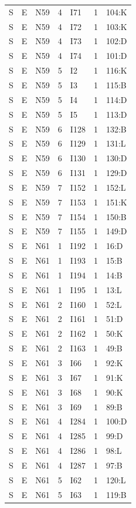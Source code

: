 {\begin{longtable}{lllrlrp{.35\linewidth}}
S & E & N59 & 4 & I71 & 1 & 104:K \\
S & E & N59 & 4 & I72 & 1 & 103:K \\
S & E & N59 & 4 & I73 & 1 & 102:D \\
S & E & N59 & 4 & I74 & 1 & 101:D \\
S & E & N59 & 5 & I2 & 1 & 116:K \\
S & E & N59 & 5 & I3 & 1 & 115:B \\
S & E & N59 & 5 & I4 & 1 & 114:D \\
S & E & N59 & 5 & I5 & 1 & 113:D \\
S & E & N59 & 6 & I128 & 1 & 132:B \\
S & E & N59 & 6 & I129 & 1 & 131:L \\
S & E & N59 & 6 & I130 & 1 & 130:D \\
S & E & N59 & 6 & I131 & 1 & 129:D \\
S & E & N59 & 7 & I152 & 1 & 152:L \\
S & E & N59 & 7 & I153 & 1 & 151:K \\
S & E & N59 & 7 & I154 & 1 & 150:B \\
S & E & N59 & 7 & I155 & 1 & 149:D \\
S & E & N61 & 1 & I192 & 1 & 16:D \\
S & E & N61 & 1 & I193 & 1 & 15:B \\
S & E & N61 & 1 & I194 & 1 & 14:B \\
S & E & N61 & 1 & I195 & 1 & 13:L \\
S & E & N61 & 2 & I160 & 1 & 52:L \\
S & E & N61 & 2 & I161 & 1 & 51:D \\
S & E & N61 & 2 & I162 & 1 & 50:K \\
S & E & N61 & 2 & I163 & 1 & 49:B \\
S & E & N61 & 3 & I66 & 1 & 92:K \\
S & E & N61 & 3 & I67 & 1 & 91:K \\
S & E & N61 & 3 & I68 & 1 & 90:K \\
S & E & N61 & 3 & I69 & 1 & 89:B \\
S & E & N61 & 4 & I284 & 1 & 100:D \\
S & E & N61 & 4 & I285 & 1 & 99:D \\
S & E & N61 & 4 & I286 & 1 & 98:L \\
S & E & N61 & 4 & I287 & 1 & 97:B \\
S & E & N61 & 5 & I62 & 1 & 120:L \\
S & E & N61 & 5 & I63 & 1 & 119:B \\

\end{longtable}}
